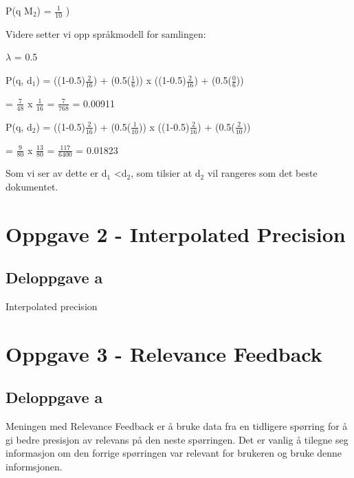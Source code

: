 \documentclass[]{article}
\begin{document}
\vspace{2mm}

P(q \textbar M$_{2}$) = $\frac{1}{10}$
)
\vspace{5mm}

\noindent Videre setter vi opp språkmodell for samlingen:\footnotemark[2]

\vspace{2mm}

$\lambda$ = 0.5

\vspace{2mm}

P(q, d$_{1}$) = ((1-0.5)$\frac{2}{16}$) + (0.5($\frac{1}{6}$))  x  ((1-0.5)$\frac{2}{16}$) + (0.5($\frac{0}{6}$))

\hspace{8.4ex} = $\frac{7}{48}$  x  $\frac{1}{16}$   =   $\frac{7}{768}$  =  0.00911  

\vspace{4mm}

P(q, d$_{2}$) = ((1-0.5)$\frac{2}{16}$) + (0.5($\frac{1}{10}$))  x  ((1-0.5)$\frac{2}{16}$) + (0.5($\frac{2}{10}$))

\hspace{8.4ex} = $\frac{9}{80}$  x  $\frac{13}{80}$   =   $\frac{117}{6400}$  =  0.01823  

\vspace{2mm} 

\noindent Som vi ser av dette er d$_{1}$ \textless d$_{2}$, som tilsier at d$_{2}$ vil rangeres som det beste dokumentet. 

\pagebreak

\section*{Oppgave 2 - Interpolated Precision}
\subsection*{Deloppgave a}
Interpolated precision


\pagebreak
\section*{Oppgave 3 - Relevance Feedback}
\subsection*{Deloppgave a}
Meningen med Relevance Feedback er å bruke data fra en tidligere spørring for å gi bedre presisjon av relevans på den neste spørringen. Det er vanlig å tilegne seg informasjon om den forrige spørringen var relevant for brukeren og bruke denne informsjonen. 
\end{document}
